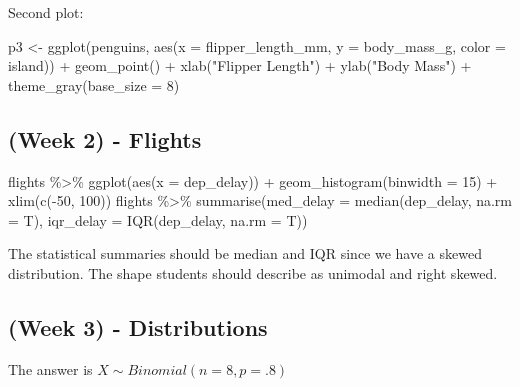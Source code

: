 \documentclass[
]{article}
\newenvironment{Shaded}{\begin{snugshade}}{\end{snugshade}}
\newcommand{\AttributeTok}[1]{\textcolor[rgb]{0.77,0.63,0.00}{#1}}
\newcommand{\DecValTok}[1]{\textcolor[rgb]{0.00,0.00,0.81}{#1}}
\newcommand{\FunctionTok}[1]{\textcolor[rgb]{0.00,0.00,0.00}{#1}}
\newcommand{\NormalTok}[1]{#1}
\newcommand{\OtherTok}[1]{\textcolor[rgb]{0.56,0.35,0.01}{#1}}
\newcommand{\SpecialCharTok}[1]{\textcolor[rgb]{0.00,0.00,0.00}{#1}}
\newcommand{\StringTok}[1]{\textcolor[rgb]{0.31,0.60,0.02}{#1}}
\begin{document}
Second plot:

\begin{Shaded}
\begin{Highlighting}[]
\NormalTok{p3 }\OtherTok{\textless{}{-}} \FunctionTok{ggplot}\NormalTok{(penguins,}
             \FunctionTok{aes}\NormalTok{(}\AttributeTok{x =}\NormalTok{ flipper\_length\_mm,}
                 \AttributeTok{y =}\NormalTok{ body\_mass\_g,}
                 \AttributeTok{color =}\NormalTok{ island)) }\SpecialCharTok{+}
  \FunctionTok{geom\_point}\NormalTok{() }\SpecialCharTok{+} \FunctionTok{xlab}\NormalTok{(}\StringTok{"Flipper Length"}\NormalTok{) }\SpecialCharTok{+} \FunctionTok{ylab}\NormalTok{(}\StringTok{"Body Mass"}\NormalTok{) }\SpecialCharTok{+} 
      \FunctionTok{theme\_gray}\NormalTok{(}\AttributeTok{base\_size =} \DecValTok{8}\NormalTok{)}
\end{Highlighting}
\end{Shaded}

\hypertarget{week-2---flights}{%
\subsection{(Week 2) - Flights}\label{week-2---flights}}

\begin{Shaded}
\begin{Highlighting}[]
\NormalTok{flights }\SpecialCharTok{\%\textgreater{}\%}
  \FunctionTok{ggplot}\NormalTok{(}\FunctionTok{aes}\NormalTok{(}\AttributeTok{x =}\NormalTok{ dep\_delay)) }\SpecialCharTok{+} 
  \FunctionTok{geom\_histogram}\NormalTok{(}\AttributeTok{binwidth =} \DecValTok{15}\NormalTok{) }\SpecialCharTok{+}
  \FunctionTok{xlim}\NormalTok{(}\FunctionTok{c}\NormalTok{(}\SpecialCharTok{{-}}\DecValTok{50}\NormalTok{, }\DecValTok{100}\NormalTok{))}
\NormalTok{flights }\SpecialCharTok{\%\textgreater{}\%}
  \FunctionTok{summarise}\NormalTok{(}\AttributeTok{med\_delay =} \FunctionTok{median}\NormalTok{(dep\_delay, }\AttributeTok{na.rm =}\NormalTok{ T),}
            \AttributeTok{iqr\_delay =} \FunctionTok{IQR}\NormalTok{(dep\_delay, }\AttributeTok{na.rm =}\NormalTok{ T))}
\end{Highlighting}
\end{Shaded}

The statistical summaries should be median and IQR since we have a
skewed distribution. The shape students should describe as unimodal and
right skewed.

\hypertarget{week-3---distributions}{%
\subsection{(Week 3) - Distributions}\label{week-3---distributions}}

The answer is \(X \sim Binomial(n = 8, p =.8)\)
\end{document}
